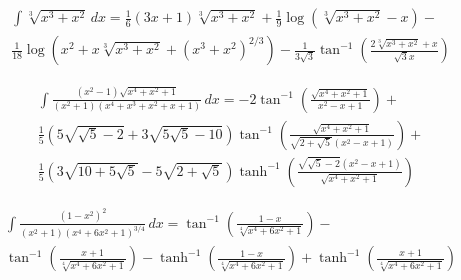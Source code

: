 \documentclass[12pt]{article}
\numberwithin{equation}{section}
\theoremstyle{definition}
\begin{document}
\begin{multline*}
\int \sqrt[3]{x^3+x^2} \, dx=\frac{1}{6} (3 x+1)\sqrt[3]{x^3+x^2} + 
\frac{1}{9} \log\left(\sqrt[3]{x^3+x^2}-x\right)- \\
   \frac{1}{18} \log \left(x^2+x\sqrt[3]{x^3+x^2}+\left(x^3+x^2\right)^{2/3}\right)-
   \frac{1}{3 \sqrt{3}}\tan^{-1}\left(\frac{2 \sqrt[3]{x^3+x^2}+x}{\sqrt{3} x}\right)
\end{multline*}

\begin{multline*}
\int \frac{\left(x^2-1\right)
   \sqrt{x^4+x^2+1}}{\left(x^2+1\right) \left(x^4+x^3+x^2+x+1\right)} \, dx=-2
   \tan ^{-1}\left(\frac{\sqrt{x^4+x^2+1}}{x^2-x+1}\right)+ \\ 
   \frac{1}{5} \left(5\sqrt{\sqrt{5}-2}+3 \sqrt{5 \sqrt{5}-10}\right) \tan
   ^{-1}\left(\frac{\sqrt{x^4+x^2+1}}{\sqrt{2+\sqrt{5}}
   \left(x^2-x+1\right)}\right)+ \\ 
   \frac{1}{5} \left(3 \sqrt{10+5 \sqrt{5}}-5\sqrt{2+\sqrt{5}}\right) \tanh ^{-1}\left(\frac{\sqrt{\sqrt{5}-2}
   \left(x^2-x+1\right)}{\sqrt{x^4+x^2+1}}\right)
\end{multline*}

\begin{multline*}
\int \frac{\left(1-x^2\right)^2}{\left(x^2+1\right) \left(x^4+6
   x^2+1\right)^{3/4}} \, dx=\tan ^{-1}\left(\frac{1-x}{\sqrt[4]{x^4+6x^2+1}}\right)- \\
   \tan ^{-1}\left(\frac{x+1}{\sqrt[4]{x^4+6 x^2+1}}\right)-
   \tanh^{-1}\left(\frac{1-x}{\sqrt[4]{x^4+6 x^2+1}}\right)+
   \tanh^{-1}\left(\frac{x+1}{\sqrt[4]{x^4+6 x^2+1}}\right)
\end{multline*}
\fi
\end{document}
